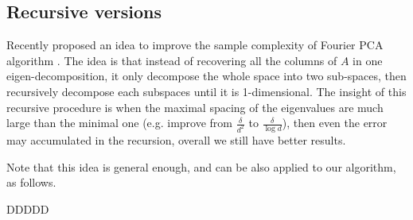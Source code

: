 
\subsection{Recursive versions}

Recently \citet{vempala2014max} proposed an idea to improve the sample complexity of Fourier PCA algorithm \citep{goyal2014fourier}. 
The idea is that instead of recovering all the columns of $A$ in one eigen-decomposition, it only decompose the whole space into two sub-spaces, 
then recursively decompose each subspaces until it is 1-dimensional.
The insight of this recursive procedure is when the maximal spacing of the eigenvalues are much large than  the minimal one (e.g. improve from $\frac{\delta}{d^2}$ to $\frac{\delta}{\log d}$), then even the error may accumulated in the recursion, overall we still have better results. 



Note that this idea is general enough, and can be also applied to our algorithm, as follows. 

\begin{thm}
\label{thm:recursiveAlg}
DDDDD
\end{thm} 